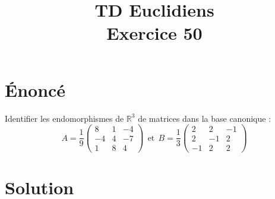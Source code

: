 \documentclass[french]{article}
\title{TD Euclidiens\\ Exercice 50}
\date{}
\newcommand{\R}{\mathbb{R}}
\begin{document}
\maketitle

\section{Énoncé}
Identifier les endomorphismes de $\R^3$ de matrices dans la base canonique : $$A=\frac{1}{9}\begin{pmatrix}
	8&1&-4\\
	-4&4&-7\\
	1&8&4
\end{pmatrix}\ \ \text{et}\ \  B=\frac{1}{3}\begin{pmatrix}
2&2&-1\\
2&-1&2\\
-1&2&2
\end{pmatrix}$$
\section{Solution}
\end{document}
